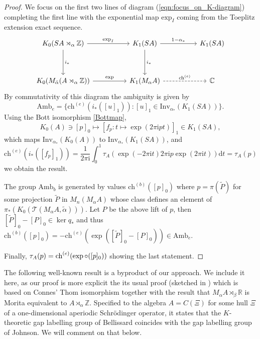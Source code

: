 \documentclass[11pt]{amsart}
\newcommand{\R}{\mathbb{R}}
\newcommand{\Z}{\mathbb{Z}}
\newcommand{\C}{\mathbb{C}}
\newcommand{\chb}{\text{ch}^{(b)}}
\newcommand{\che}{\text{ch}^{(e)}}
\begin{document}
\begin{proof}
We focus on the first two lines of diagram 
(\ref{eqn:focus_on_K-diagram}) completing the first line with the exponential map $\mathrm{exp}_I$ coming from the Toeplitz extension exact sequence. 
	\begin{equation*}
		\begin{tikzcd}
			{K_0(SA \rtimes_\alpha \mathbb{Z})} && K_1(SA) && K_1(SA) \\
			\\
			{K_0(M_{\bar{\alpha}}(A \rtimes_\alpha \mathbb{Z}))} && {K_1(M_\alpha A)} && \C  
			\arrow["{i_*}", from=1-1, to=3-1]
			\arrow["{i_*}", from=1-3, to=3-3]
			\arrow["{\exp}", from=3-1, to=3-3]
			\arrow["{\mathrm{exp}_I}", from=1-1, to=1-3]
			\arrow[dashed, "{\che}", from=3-3, to=3-5]
			\arrow["{1-\alpha_*}", from=1-3, to=1-5]
		\end{tikzcd}
	\end{equation*}
	By commutativity of this diagram the ambiguity is given by 
	\begin{equation}%
		\mathrm{Amb}_e= \{\che(i_*([u]_1)):[u]_1\in \mathrm{Inv}_{\alpha_*} (K_1(SA))\}.
	\end{equation}
	Using the Bott isomorphism \eqref{Bottmap},
	$$K_0(A)\ni [p]_0\mapsto [f_p:t\mapsto\exp(2\pi\mathrm{i}pt)]_1\in K_1(SA),$$
	which maps $\mathrm{Inv}_{\alpha_*} (K_0(A))$ to $\mathrm{Inv}_{\alpha_*} (K_1(SA))$, and
	$$\che(i_*([f_p]_1))=\frac{1}{2\pi\mathrm{i}}\int_0^1 \tau_A(\exp (-2\pi\mathrm{i}t)2\pi\mathrm{i}p \exp (2\pi\mathrm{i}t))\mathrm{d}t= \tau_A(p)$$
	we obtain the result.
	
	The group $\mathrm{Amb}_b$ is generated by values $\chb([p]_0)$ where $p=\pi(\tilde P)$ for some projection $\tilde P$ in $M_n(M_\alpha A)$ whose class defines an element of $\pi_*(K_0(\mathcal T(M_\alpha A,\tilde\alpha)))$. Let $P$ be the above lift of $p$, then $[\tilde P]_0-[P]_0\in \ker q_*$ and thus 
	$\chb([p]_0) = -\che(\exp([\tilde P]_0-[P]_0))\in \mathrm{Amb}_e$.
	
Finally, $\tau_A(p) = \che(\exp \circ \sc([p]_0))$ showing the last statement.
\end{proof}
The following well-known result is a byproduct of our approach. We include it here, as our proof is more explicit the its usual proof (sketched in \cite{Bellissard1992}) which is based on  
Connes' Thom isomorphism \cite{connes1981analogue} together with the result that $M_\alpha A \rtimes_\beta \R$ is Morita equivalent to $A \rtimes_\alpha \Z$. 
Specified to the algebra $A=C(\Xi)$ for some hull $\Xi$ of a one-dimensional aperiodic Schr\"odinger operator, it states that the $K$-theoretic gap labelling group of Bellissard coincides with the gap labelling group of Johnson. We will comment on that below.
\end{document}
